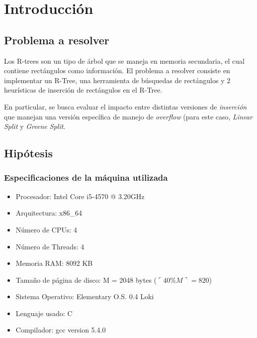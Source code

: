 \documentclass[letterpaper,10pt]{article}
\begin{document}
	\newpage

	\section{Introducción}

	\subsection{Problema a resolver}

	Los R-trees son un tipo de árbol que se maneja en memoria secundaria, el cual contiene rectángulos como información. El problema a resolver consiste en implementar un R-Tree,
	una herramienta de búsquedas de rectángulos y 2 heurísticas de inserción de rectángulos en el R-Tree.

	En particular, se busca evaluar el impacto entre distintas versiones de \textit{inserción} que manejan una versión específica de manejo de \textit{overflow} (para este caso,
	\textit{Linear Split} y \textit{Greene Split}.

	\subsection{Hipótesis}

	\subsubsection*{Especificaciones de la máquina utilizada}

	\begin{itemize}
		\item Procesador: Intel \textregistered Core \textregistered i5-4570 @ 3.20GHz
		\item Arquitectura: x86\_64
		\item Número de CPUs: 4
		\item Número de Threads: 4
		\item Memoria RAM: 8092 KB
		\item Tamaño de página de disco: M = 2048 bytes ($\ulcorner40\% M\urcorner = 820$)
		\item Sistema Operativo: Elementary O.S. 0.4 Loki
		\item Lenguaje usado: C
		\item Compilador: gcc version 5.4.0
	\end{itemize}
\end{document}
